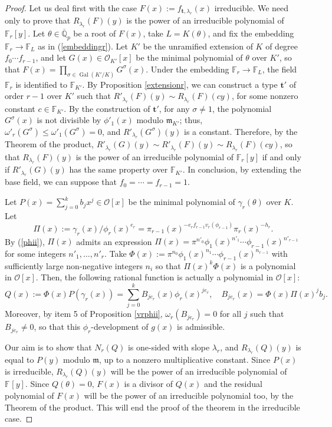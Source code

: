 \documentclass{amsart}
\def\op{\operatorname}
\def\ff#1{\mathbb{F}_{#1}}
\def\ga{\gamma}
\def\la{\lambda}
\def\m{{\mathfrak m}}
\def\om{\omega}
\def\oo{{\mathcal O}}
\def\qpb{\overline{\mathbb{Q}}_p}
\def\t{\theta}
\def\ty{\mathbf{t}}
\def\zpx{\oo[x]}
\begin{document}
\begin{proof}
Let us deal first with the case $F(x):=f_{\ty,\la_r}(x)$ irreducible. We need only to prove that $R_{\la_r}(F)(y)$ is the power of an irreducible polynomial of $\ff{r}[y]$. Let $\t\in\qpb$ be a root of $F(x)$, take $L=K(\t)$, and fix the embedding $\ff{r}\to\ff{L}$ as in (\ref{embeddingr}). Let $K'$ be the unramified extension of $K$ of degree $f_0\cdots f_{r-1}$, and let $G(x)\in\oo_{K'}[x]$ be the minimal polynomial of $\t$ over $K'$, so that $F(x)=\prod_{\sigma\in\op{Gal}(K'/K)}G^{\sigma}(x)$. Under the embedding $\ff{r}\to\ff{L}$, the field $\ff{r}$ is identified to $\ff{K'}$. By Proposition \ref{extensionr}, we can construct a type $\ty'$ of order $r-1$ over $K'$ such that $R'_{\la_r}(F)(y)\sim R_{\la_r}(F)(cy)$, for some nonzero constant $c\in\ff{K'}$. By the construction of $\ty'$, for any $\sigma\ne1$, the polynomial $G^{\sigma}(x)$ is not divisible by $\phi'_1(x)$ modulo $\m_{K'}$; thus, $\om'_r(G^{\sigma})\le \om'_1(G^{\sigma})=0$, and $R'_{\la_r}(G^{\sigma})(y)$ is a constant. Therefore, by the Theorem of the product, $R'_{\la_r}(G)(y)\sim R'_{\la_r}(F)(y)\sim R_{\la_r}(F)(cy)$, so that $R_{\la_r}(F)(y)$ is the power of an irreducible polynomial of $\ff{r}[y]$ if and only if 
$R'_{\la_r}(G)(y)$ has the same property over $\ff{K'}$. In conclusion, by extending the base field, we can suppose that $f_0=\cdots =f_{r-1}=1$.

Let $P(x)=\sum_{j=0}^kb_jx^j\in\zpx$ be the minimal polynomial of $\ga_r(\t)$ over $K$. Let
$$\Pi(x):=\ga_r(x)/\phi_r(x)^{e_r}=\pi_{r-1}(x)^{-e_rf_{r-1}v_r(\phi_{r-1})}\pi_r(x)^{-h_r}.$$
By (\ref{phii}), $\Pi(x)$ admits an expression $\Pi(x)=\pi^{n'_0}\phi_1(x)^{n'_1}\cdots \phi_{r-1}(x)^{n'_{r-1}}$ for some integers $n'_1,\dots,n'_r$. Take $\Phi(x):=\pi^{n_0}\phi_1(x)^{n_1}\cdots \phi_{r-1}(x)^{n_{r-1}}$ with sufficiently large non-negative integers $n_i$ so that $\Pi(x)^k\Phi(x)$ is a polynomial in $\oo[x]$. 
Then, the following rational function is actually a polynomial in $\zpx$:
$$
Q(x):=\Phi(x) P(\ga_r(x))=\sum_{j=0}^kB_{je_r}(x)\phi_r(x)^{je_r},\quad B_{je_r}(x)=\Phi(x)\Pi(x)^jb_j.
$$ Moreover, by item 5 of Proposition \ref{vrphii}, $\om_r(B_{je_r})=0$ for all $j$ such that $B_{je_r}\ne0$, so that this $\phi_r$-development of $g(x)$ is admissible.

Our aim is to show that $N_r(Q)$ is one-sided with slope $\la_r$, and $R_{\la_r}(Q)(y)$ is equal to $P(y)$ modulo $\m$, up to a nonzero multiplicative constant. Since $P(x)$ is irreducible, $R_{\la_r}(Q)(y)$ will be the power of an irreducible polynomial of $\ff{}[y]$. Since $Q(\t)=0$, $F(x)$ is a divisor of $Q(x)$ and the residual polynomial of $F(x)$ will be the  power of an irreducible polynomial too, by the Theorem of the product. This will end the proof of the theorem in the irreducible case.


\end{proof}
\end{document}
